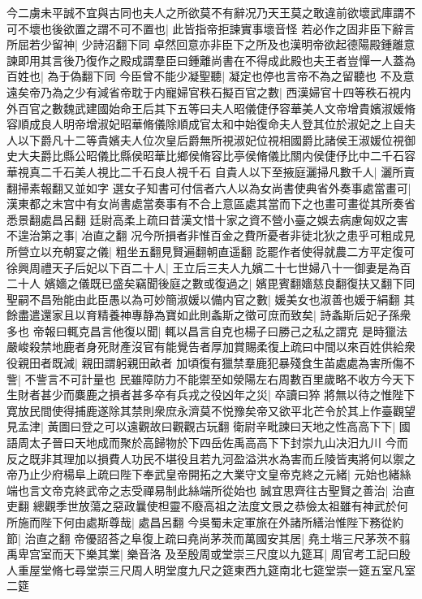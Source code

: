 今二虜未平誠不宜與古同也夫人之所欲莫不有辭况乃天王莫之敢違前欲壞武庫謂不可不壞也後欲置之謂不可不置也|{
	此皆指帝拒諫實事壞音怪}
若必作之固非臣下辭言所屈若少留神|{
	少詩沼翻下同}
卓然回意亦非臣下之所及也漢明帝欲起德陽殿鍾離意諫即用其言後乃復作之殿成謂羣臣曰鍾離尚書在不得成此殿也夫王者豈憚一人蓋為百姓也|{
	為于偽翻下同}
今臣曾不能少凝聖聽|{
	凝定也停也言帝不為之留聽也}
不及意遠矣帝乃為之少有減省帝耽于内寵婦官秩石擬百官之數|{
	西漢婦官十四等秩石視内外百官之數魏武建國始命王后其下五等曰夫人昭儀倢伃容華美人文帝增貴嬪淑媛脩容順成良人明帝增淑妃昭華脩儀除順成官太和中始復命夫人登其位於淑妃之上自夫人以下爵凡十二等貴嬪夫人位次皇后爵無所視淑妃位視相國爵比諸侯王淑媛位視御史大夫爵比縣公昭儀比縣侯昭華比鄉侯脩容比亭侯脩儀比關内侯倢伃比中二千石容華視真二千石美人視比二千石良人視千石}
自貴人以下至掖庭灑掃凡數千人|{
	灑所賣翻掃素報翻又並如字}
選女子知書可付信者六人以為女尚書使典省外奏事處當畫可|{
	漢東都之末宫中有女尚書處當奏事有不合上意區處其當而下之也畫可畫從其所奏省悉景翻處昌呂翻}
廷尉高柔上疏曰昔漢文惜十家之資不營小臺之娛去病慮匈奴之害不遑治第之事|{
	冶直之翻}
况今所損者非惟百金之費所憂者非徒北狄之患乎可粗成見所營立以充朝宴之儀|{
	粗坐五翻見賢遍翻朝直遥翻}
訖罷作者使得就農二方平定復可徐興周禮天子后妃以下百二十人|{
	王立后三夫人九嬪二十七世婦八十一御妻是為百二十人}
嬪嬙之儀既已盛矣竊聞後庭之數或復過之|{
	嬪毘賓翻嬙慈良翻復扶又翻下同}
聖嗣不昌殆能由此臣愚以為可妙簡淑媛以備内官之數|{
	媛美女也淑善也媛于絹翻}
其餘盡遣還家且以育精養神專静為寶如此則螽斯之徵可庶而致矣|{
	詩螽斯后妃子孫衆多也}
帝報曰輒克昌言他復以聞|{
	輒以昌言自克也楊子曰勝己之私之謂克}
是時獵法嚴峻殺禁地鹿者身死財產沒官有能覺告者厚加賞賜柔復上疏曰中間以來百姓供給衆役親田者既減|{
	親田謂躬親田畝者}
加頃復有獵禁羣鹿犯暴殘食生苖處處為害所傷不訾|{
	不訾言不可計量也}
民雖障防力不能禦至如滎陽左右周數百里歲略不收方今天下生財者甚少而麋鹿之損者甚多卒有兵戎之役凶年之災|{
	卒讀曰猝}
將無以待之惟陛下寛放民間使得捕鹿遂除其禁則衆庶永濟莫不悦豫矣帝又欲平北芒令於其上作臺觀望見孟津|{
	黃圖曰登之可以遠觀故曰觀觀古玩翻}
衛尉辛毗諫曰天地之性高高下下|{
	國語周太子晉曰天地成而聚於高歸物於下四岳佐禹高高下下封崇九山决汨九川}
今而反之既非其理加以損費人功民不堪役且若九河盈溢洪水為害而丘陵皆夷將何以禦之帝乃止少府楊阜上疏曰陛下奉武皇帝開拓之大業守文皇帝克終之元緒|{
	元始也緒絲端也言文帝克終武帝之志受禪易制此絲端所從始也}
誠宜思齊往古聖賢之善治|{
	治直吏翻}
總觀季世放蕩之惡政曩使柦靈不廢高祖之法度文景之恭儉太祖雖有神武於何所施而陛下何由處斯尊哉|{
	處昌呂翻}
今吳蜀未定軍旅在外諸所繕治惟陛下務從約節|{
	治直之翻}
帝優詔荅之阜復上疏曰堯尚茅茨而萬國安其居|{
	堯土堦三尺茅茨不翦}
禹卑宫室而天下樂其業|{
	樂音洛}
及至殷周或堂崇三尺度以九筵耳|{
	周官考工記曰殷人重屋堂脩七尋堂崇三尺周人明堂度九尺之筵東西九筵南北七筵堂崇一筵五室凡室二筵}
